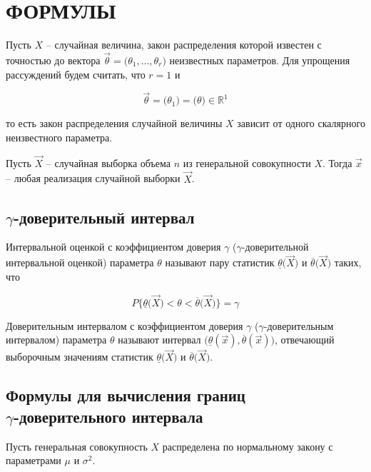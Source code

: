 \section{ФОРМУЛЫ}

Пусть $X$ -- случайная величина, закон распределения которой известен с точностью до вектора $\vec \theta = \big( \theta_1, ..., \theta_r \big)$ неизвестных параметров. Для упрощения рассуждений будем считать, что $r = 1$ и

\begin{equation*}
    \vec \theta = \big( \theta_1 \big) = \big( \theta \big) \in \mathbb{R}^1
\end{equation*}

то есть закон распределения случайной величины $X$ зависит от одного скалярного неизвестного параметра.

Пусть $\vec X$ -- случайная выборка объема $n$ из генеральной совокупности $X$. Тогда $\vec x$ -- любая реализация случайной выборки $\vec X$.

\subsection{$\gamma$-доверительный интервал}

Интервальной оценкой с коэффициентом доверия $\gamma$ ($\gamma$-доверительной интервальной оценкой) параметра $\theta$ называют пару статистик $\underline{\theta} \big( \vec X \big)$ и $\overline{\theta} \big( \vec X \big)$ таких, что

\begin{equation*}
    P \bigg\{ \underline{\theta} \big( \vec X \big) < \theta < \overline{\theta} \big( \vec X \big) \bigg\} = \gamma
\end{equation*}

Доверительным интервалом с коэффициентом доверия $\gamma$ ($\gamma$-доверительным интервалом) параметра $\theta$ называют интервал $\big( \underline{\theta} (\vec x),\overline{\theta} (\vec x) \big)$, отвечающий выборочным значениям статистик $\underline{\theta} \big( \vec X \big)$ и $\overline{\theta} \big( \vec X \big)$.

\subsection{Формулы для вычисления границ \\ $\gamma$-доверительного интервала}

Пусть генеральная совокупность $X$ распределена по нормальному закону с параметрами $\mu$ и $\sigma^2$.

